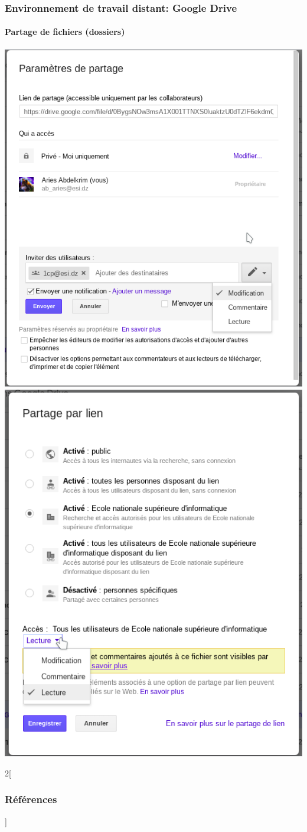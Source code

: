 \documentclass[xcolor=table]{beamer}
\begin{document}
\begin{frame}
\frametitle{Environnement de travail distant: Google Drive}
\framesubtitle{Partage de fichiers (dossiers)}

\begin{center}
	\includegraphics[width=
	.45\textwidth]{../img/Bweb01-environnement/drive-share1.png}
	\includegraphics[width=
	.45\textwidth]{../img/Bweb01-environnement/drive-share2.png}
\end{center}

\end{frame}

\nocite{*}
%
% 

\begin{multicols*}{2}[\frametitle{Références}]%
	\tiny
	
	
\end{multicols*}
\end{document}
